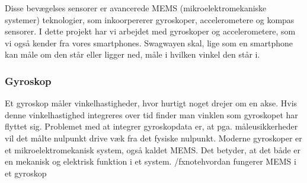 \documentclass[a4paper,oneside,article,danish,table]{memoir}
\begin{document}
Disse bevægelses sensorer er avancerede MEMS (mikroelektromekaniske systemer) teknologier, som inkoorpererer gyroskoper, accelerometere og kompas sensorer. %
I dette projekt har vi arbejdet med gyroskoper og accelerometere, som vi også kender fra vores smartphones. Swagwayen skal, lige som en smartphone kan måle om den står eller ligger ned, måle i hvilken vinkel den står i.   

\subsubsection{Gyroskop}
Et gyroskop måler vinkelhastigheder, hvor hurtigt noget drejer om en akse. Hvis denne vinkelhastighed integreres over tid finder man vinklen som gyroskopet har flyttet sig. Problemet med at integrer gyroskopdata er, at pga. måleusikkerheder vil det målte nulpunkt drive væk fra det fysiske nulpunkt. Moderne gyroskoper er et mikroelektromekanisk system, også kaldet MEMS. Det betyder, at det både er en mekanisk og elektrisk funktion i et system. /fxnote{hvordan fungerer MEMS i et gyroskop}
\end{document}
